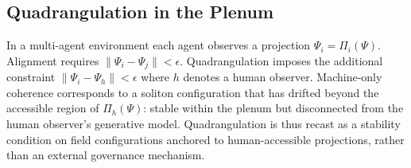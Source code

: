 \documentclass[12pt,a4paper]{article}
\begin{document}
\subsection*{Quadrangulation in the Plenum}

In a multi-agent environment each agent observes a projection $\Psi_i = \Pi_i(\Psi)$.
Alignment requires $\|\Psi_i - \Psi_j\| < \epsilon$. Quadrangulation \citep{jelinek2026}
imposes the additional constraint $\|\Psi_i - \Psi_h\| < \epsilon$ where $h$ denotes a human
observer. Machine-only coherence corresponds to a soliton configuration that has drifted
beyond the accessible region of $\Pi_h(\Psi)$: stable within the plenum but disconnected from
the human observer's generative model. Quadrangulation is thus recast as a stability condition
on field configurations anchored to human-accessible projections, rather than an external
governance mechanism.

\newpage


\end{document}
